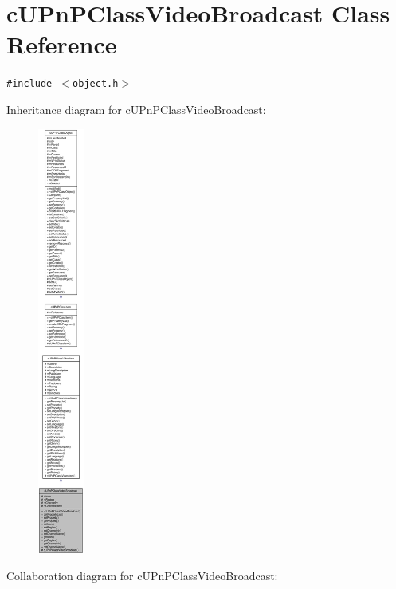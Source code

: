 \hypertarget{classcUPnPClassVideoBroadcast}{
\section{cUPnPClassVideoBroadcast Class Reference}
\label{classcUPnPClassVideoBroadcast}
}
{\tt \#include $<$object.h$>$}

Inheritance diagram for cUPnPClassVideoBroadcast:\nopagebreak
\begin{figure}[H]
\begin{center}
\leavevmode
\includegraphics[height=400pt]{classcUPnPClassVideoBroadcast__inherit__graph}
\end{center}
\end{figure}
Collaboration diagram for cUPnPClassVideoBroadcast:\nopagebreak
